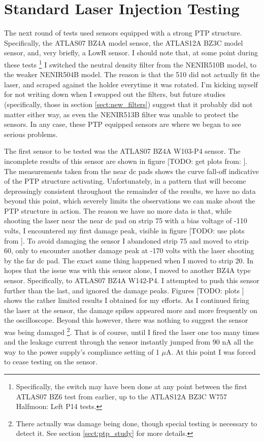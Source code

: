 \documentclass{report}
\begin{document}
        \section{Standard Laser Injection Testing} \label{sect:std_tests}
            The next round of tests used sensors equipped with a strong PTP structure. Specifically, the ATLAS07 BZ4A model sensor, the ATLAS12A BZ3C model sensor, and, very briefly, a LowR sensor. I should note that, at some point during these tests \footnote{Specifically, the switch may have been done at any point between the first ATLAS07 BZ6 test from earlier, up to the ATLAS12A BZ3C W757 Halfmoon: Left P14 tests.} I switched the neutral density filter from the NENIR510B model, to the weaker NENIR504B model. The reason is that the 510 did not actually fit the laser, and scraped against the holder everytime it was rotated. I'm kicking myself for not writing down when I swapped out the filters, but future studies (specifically, those in section \ref{sect:new_filters}) suggest that it probably did not matter either way, as even the NENIR513B filter was unable to protect the sensors. In any case, these PTP equipped sensors are where we began to see serious problems.
            
            The first sensor to be tested was the ATLAS07 BZ4A W103-P4 sensor. The incomplete results of this sensor are shown in figure [TODO: get plots from:
            ]. The measurements taken from the near dc pads shows the curve fall-off indicative of the PTP structure activating. Unfortunately, in a pattern that will become depressingly consistent throughout the remainder of the results, we have no data beyond this point, which severely limits the observations we can make about the PTP structure in action. The reason we have no more data is that, while shooting the laser near the near dc pad on strip 75 with a bias voltage of -110 volts, I encountered my first damage peak, visible in figure [TODO: use plots from
            ]. To avoid damaging the sensor I abandoned strip 75 and moved to strip 60, only to encounter another damage peak at -170 volts with the laser shooting by the far dc pad. The exact same thing happened when I moved to strip 20. In hopes that the issue was with this sensor alone, I moved to another BZ4A type sensor. Specifically, to ATLAS07 BZ4A W142-P4. I attempted to push this sensor further than the last, and ignored the damage peaks. Figures [TODO: plots
            ] shows the rather limited results I obtained for my efforts. As I continued firing the laser at the sensor, the damage spikes appeared more and more frequently on the oscilloscope. Beyond this however, there was nothing to suggest the sensor was being damaged \footnote{There actually was damage being done, though special testing is necessary to detect it. See section \ref{sect:ptp_study} for more details.}. That is of course, until I fired the laser one too many times and the leakage current through the sensor instantly jumped from 90 nA all the way to the power supply's compliance setting of 1 $\mu$A. At this point I was forced to cease testing on the sensor.
\end{document}
